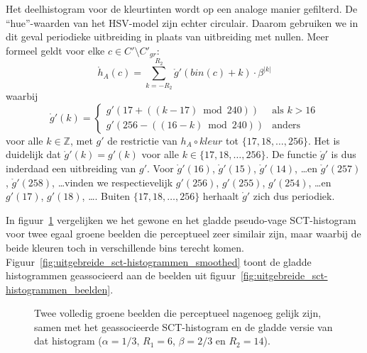 Het deelhistogram voor de kleurtinten wordt op een analoge manier gefilterd. 
De ``hue''-waarden van het HSV-model zijn echter circulair. Daarom gebruiken we in dit geval
periodieke uitbreiding in plaats van uitbreiding met nullen. Meer formeel geldt voor 
elke $c \in C' \setminus C'_{gr}$:
$$
\mathring{h}_A(c) = \sum_{k=-R_2}^{R_2} \mathring{g}'(bin(c)+k) \cdot \beta^{|k|}
$$
waarbij
$$
\mathring{g}'(k) = \left\{ \begin{array}{ll}
g'(17  + ((k-17) \bmod 240)) & \textrm{als } k > 16 \\
g'(256 - ((16-k) \bmod 240)) & \textrm{anders}
\end{array} \right.
$$
voor alle $k \in \mathbb{Z}$, met $g'$ de restrictie van $h_A \circ kleur$
tot $\{17,18,\ldots,256\}$. Het is duidelijk dat $\mathring{g}'(k)=g'(k)$ voor alle 
$k \in \{17,18,\ldots,256\}$. De functie $\mathring{g}'$ is dus inderdaad een uitbreiding
van $g'$. Voor $\mathring{g}'(16)$, $\mathring{g}'(15)$, $\mathring{g}'(14)$, \ldots en
$\mathring{g}'(257)$, $\mathring{g}'(258)$, \ldots vinden we respectievelijk
$g'(256)$, $g'(255)$, $g'(254)$, \ldots en $g'(17)$, $g'(18)$, \ldots . Buiten
$\{17,18,\ldots,256\}$ herhaalt $\mathring{g}'$ zich dus periodiek. 

In figuur~\ref{fig:histogrammen_smoothed_sct} vergelijken we het gewone en het gladde pseudo-vage 
SCT-histogram voor twee egaal groene beelden die perceptueel zeer similair zijn, maar waarbij 
de beide kleuren toch in verschillende bins terecht komen. 
Figuur~\ref{fig:uitgebreide_sct-histogrammen_smoothed} toont de gladde histogrammen 
geassocieerd aan de beelden uit figuur~\ref{fig:uitgebreide_sct-histogrammen_beelden}.


\begin{figure}[tbp]
\begin{center}
\caption{\label{fig:histogrammen_smoothed_sct}Twee volledig groene beelden die perceptueel 
nagenoeg gelijk zijn, samen met het geassocieerde SCT-histogram en de gladde versie van dat 
histogram ($\alpha=1/3$, $R_1=6$, $\beta=2/3$ en $R_2=14$).}
\end{center}
\end{figure}

